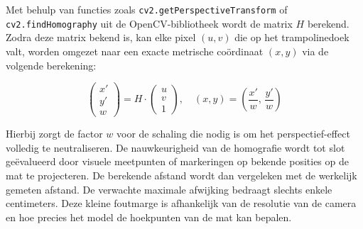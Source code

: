 Met behulp van functies zoals \texttt{cv2.getPerspectiveTransform} of \texttt{cv2.findHomography} uit de OpenCV-bibliotheek wordt de matrix $H$ berekend. Zodra deze matrix bekend is, kan elke pixel $(u, v)$ die op het trampolinedoek valt, worden omgezet naar een exacte metrische co{\"o}rdinaat $(x, y)$ via de volgende berekening:

\[
    \begin{pmatrix} x' \\ y' \\ w \end{pmatrix} = H \cdot \begin{pmatrix} u \\ v \\ 1 \end{pmatrix}, \quad (x, y) = \left(\frac{x'}{w},\, \frac{y'}{w}\right)
\]

Hierbij zorgt de factor $w$ voor de schaling die nodig is om het perspectief-effect volledig te neutraliseren. De nauwkeurigheid van de homografie wordt tot slot ge{\"e}valueerd door visuele meetpunten of markeringen op bekende posities op de mat te projecteren. De berekende afstand wordt dan vergeleken met de werkelijk gemeten afstand. De verwachte maximale afwijking bedraagt slechts enkele centimeters. Deze kleine foutmarge is afhankelijk van de resolutie van de camera en hoe precies het model de hoekpunten van de mat kan bepalen.

